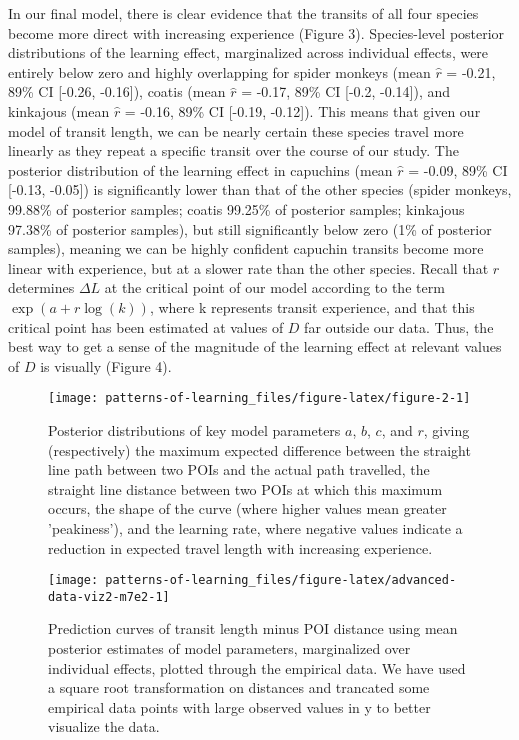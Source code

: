 \documentclass[twoside,12pt,final]{ucthesis-CA2012}
\begin{document}
\begin{ucmainmatter}
In our final model, there is clear evidence that the transits of all four species become more direct with increasing experience (Figure 3). Species-level posterior distributions of the learning effect, marginalized across individual effects, were entirely below zero and highly overlapping for spider monkeys (mean \(\hat r\) = -0.21, 89\% CI {[}-0.26, -0.16{]}), coatis (mean \(\hat r\) = -0.17, 89\% CI {[}-0.2, -0.14{]}), and kinkajous (mean \(\hat r\) = -0.16, 89\% CI {[}-0.19, -0.12{]}). This means that given our model of transit length, we can be nearly certain these species travel more linearly as they repeat a specific transit over the course of our study. The posterior distribution of the learning effect in capuchins (mean \(\hat r\) = -0.09, 89\% CI {[}-0.13, -0.05{]}) is significantly lower than that of the other species (spider monkeys, 99.88\% of posterior samples; coatis 99.25\% of posterior samples; kinkajous 97.38\% of posterior samples), but still significantly below zero (1\% of posterior samples), meaning we can be highly confident capuchin transits become more linear with experience, but at a slower rate than the other species. Recall that \(r\) determines \(\Delta L\) at the critical point of our model according to the term \(\exp(a + r\log(k))\), where k represents transit experience, and that this critical point has been estimated at values of \(D\) far outside our data. Thus, the best way to get a sense of the magnitude of the learning effect at relevant values of \(D\) is visually (Figure 4).
\begin{figure}
\texttt{[image: patterns-of-learning\_files/figure-latex/figure-2-1]} \caption[Posterior distributions of key model parameters.]{Posterior distributions of key model parameters $a$, $b$, $c$, and $r$, giving (respectively) the maximum expected difference between the straight line path between two POIs and the actual path travelled, the straight line distance between two POIs at which this maximum occurs, the shape of the curve (where higher values mean greater 'peakiness'), and the learning rate, where negative values indicate a reduction in expected travel length with increasing experience.}\label{fig:figure-2}
\end{figure}
\begin{figure}
\texttt{[image: patterns-of-learning\_files/figure-latex/advanced-data-viz2-m7e2-1]} \caption[Transit length prediction curves]{Prediction curves of transit length minus POI distance using mean posterior estimates of model parameters, marginalized over individual effects, plotted through the empirical data. We have used a square root transformation on distances and trancated some empirical data points with large observed values in y to better visualize the data.}\label{fig:advanced-data-viz2-m7e2}
\end{figure}
\hypertarget{discussion-3}{%
}
\end{ucmainmatter}
\end{document}
